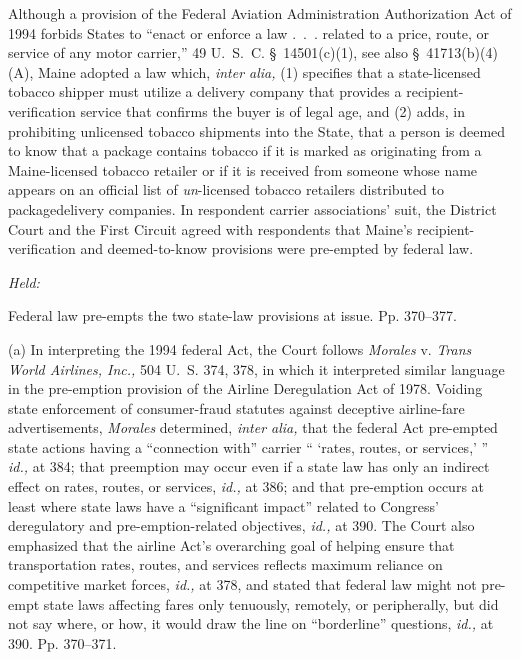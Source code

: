 
\setcounter{page}{364}

\noindent Although a provision of the Federal Aviation Administration
Authorization Act of 1994 forbids States to ``enact or enforce a law
.~.~. related to a price, route, or service of any motor carrier,''
49 U.~S.~C. \S~14501(c)(1), see also \S~41713(b)(4)(A), Maine
adopted a law which, \emph{inter alia,} (1) specifies that a state-licensed
tobacco shipper must utilize a delivery company that provides a
recipient-verification service that confirms the buyer is of legal age,
and (2) adds, in prohibiting unlicensed tobacco shipments into the
State, that a person is deemed to know that a package contains tobacco
if it is marked as originating from a Maine-licensed tobacco retailer or
if it is received from someone whose name appears on an official list
of \emph{un}-licensed tobacco retailers distributed to packagedelivery
companies. In respondent carrier associations' suit, the District
Court and the First Circuit agreed with respondents that Maine's
recipient-verification and deemed-to-know provisions were pre-empted by
federal law.

\emph{Held:}

\noindent Federal law pre-empts the two state-law provisions at issue. Pp.
370--377.

  (a) In interpreting the 1994 federal Act, the Court follows
\emph{Morales} v. \emph{Trans World Airlines, Inc.,} 504 U.~S. 374, 378,
in which it interpreted similar language in the pre-emption provision
of the Airline Deregulation Act of 1978. Voiding state enforcement of
consumer-fraud statutes against deceptive airline-fare advertisements,
\emph{Morales} determined, \emph{inter alia,} that the federal Act pre-empted
state actions having a ``connection with'' carrier `` ‘rates,
routes, or services,' '' \emph{id.,} at 384; that preemption may
occur even if a state law has only an indirect effect on rates, routes,
or services, \emph{id.,} at 386; and that pre-emption occurs at least
where state laws have a ``significant impact'' related to Congress'
deregulatory and pre-emption-related objectives, \emph{id.,} at 390.
The Court also emphasized that the airline Act's overarching goal of
helping ensure that transportation rates, routes, and services reflects
maximum reliance on competitive market forces, \emph{id.,} at 378, and
stated that federal law might not pre-empt state laws affecting fares
only tenuously, remotely, or peripherally, but did not say where, or
how, it would draw the line on ``borderline'' questions, \emph{id.,} at
390. Pp. 370--371. \newpage 

